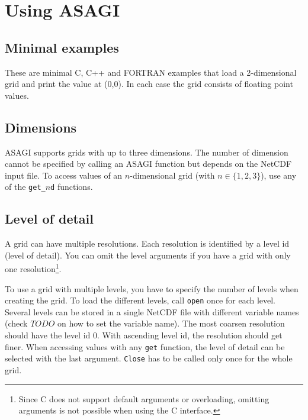 \section{Using ASAGI}

\subsection{Minimal examples}

These are minimal C, C++ and FORTRAN examples that load a 2-dimensional grid and print the value at (0,0). In each case the grid consists of floating point values.







\subsection{Dimensions}

ASAGI supports grids with up to three dimensions. The number of dimension cannot be specified by calling an ASAGI function but depends on the NetCDF input file. To access values of an $n$-dimensional grid (with $n\in\{1,2,3\}$), use any of the \texttt{get\_$n$d} functions.

\subsection{Level of detail}

A grid can have multiple resolutions. Each resolution is identified by a level id (level of detail). You can omit the level arguments if you have a grid with only one resolution\footnote{Since C does not support default arguments or overloading, omitting arguments is not possible when using the C interface.}.

To use a grid with multiple levels, you have to specify the number of levels when creating the grid. To load the different levels, call \texttt{open} once for each level. Several levels can be stored in a single NetCDF file with different variable names (check $TODO$ on how to set the variable name). The most coarsen resolution should have the level id 0. With ascending level id, the resolution should get finer. When accessing values with any \texttt{get} function, the level of detail can be selected with the last argument. \texttt{Close} has to be called only once for the whole grid.